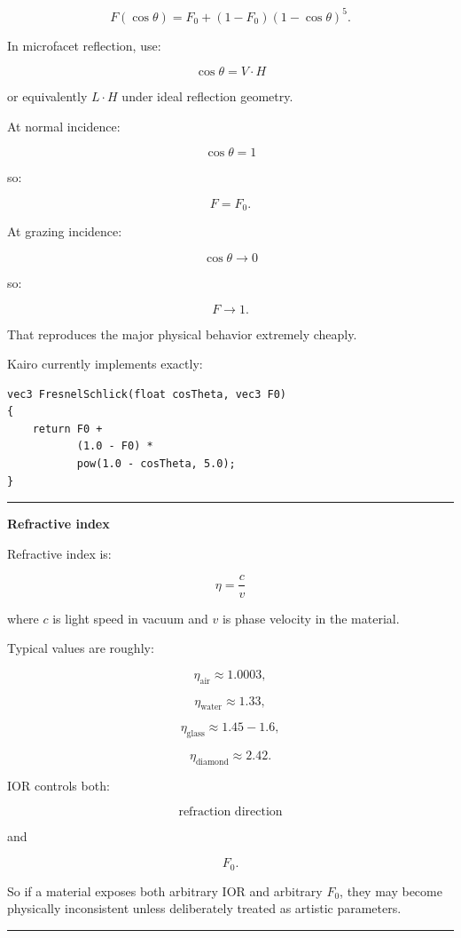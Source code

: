 \[
\boxed{
F(\cos\theta)
=
F_0
+
(1-F_0)(1-\cos\theta)^5.
}
\]

In microfacet reflection, use:

\[
\cos\theta=
V\cdot H
\]

or equivalently \(L\cdot H\) under ideal reflection geometry.

At normal incidence:

\[
\cos\theta=1
\]

so:

\[
F=F_0.
\]

At grazing incidence:

\[
\cos\theta\rightarrow0
\]

so:

\[
F\rightarrow1.
\]

That reproduces the major physical behavior extremely cheaply.

Kairo currently implements exactly:

\begin{verbatim}
vec3 FresnelSchlick(float cosTheta, vec3 F0)
{
    return F0 +
           (1.0 - F0) *
           pow(1.0 - cosTheta, 5.0);
}
\end{verbatim}

\begin{center}\rule{0.5\linewidth}{0.5pt}\end{center}

\textbf{Refractive index}

Refractive index is:

\[
\boxed{
\eta=\frac{c}{v}
}
\]

where \(c\) is light speed in vacuum and \(v\) is phase velocity in the material.

Typical values are roughly:

\[
\eta_{\text{air}}\approx1.0003,
\]

\[
\eta_{\text{water}}\approx1.33,
\]

\[
\eta_{\text{glass}}\approx1.45-1.6,
\]

\[
\eta_{\text{diamond}}\approx2.42.
\]

IOR controls both:

\[
\text{refraction direction}
\]

and

\[
F_0.
\]

So if a material exposes both arbitrary IOR and arbitrary \(F_0\), they may become physically inconsistent unless deliberately treated as artistic parameters.

\begin{center}\rule{0.5\linewidth}{0.5pt}\end{center}

